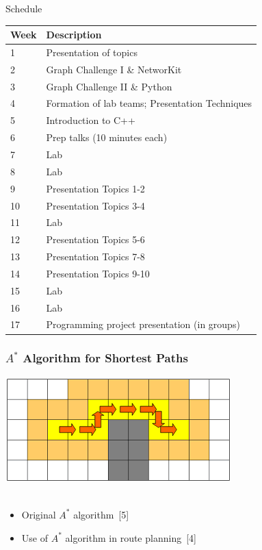 \documentclass[titlepage,german,presentation]{beamer}
\begin{document}
\begin{frame}{Schedule}

\small{
    \centering
      \begin{tabular}{|l||l|} \hline
        Week & Description  \\ \hline
        1 &  Presentation of topics \\
        2 &  Graph Challenge I \& NetworKit \\
        3 &  Graph Challenge II \& Python \\
        4 &  Formation of lab teams; Presentation Techniques \\
        5 &  Introduction to C++ \\
        6 &  Prep talks (10 minutes each) \\
        7 &  Lab \\
        8 &  Lab \\
        9 &  Presentation Topics 1-2 \\
        10 & Presentation Topics 3-4 \\
        11 & Lab \\ 
        12 & Presentation Topics 5-6 \\
        13 & Presentation Topics 7-8 \\
        14 & Presentation Topics 9-10 \\ 
        15 & Lab \\
        16 & Lab \\
        17 & Programming project presentation (in groups) \\ \hline
      \end{tabular}
}
\end{frame}



\begin{frame}
\frametitle{$A^*$ Algorithm for Shortest Paths}

\begin{center}
\includegraphics[height=0.2\textwidth]{obstacle.png}\\
~\\
\end{center}

\begin{itemize}
\item Original $A^*$ algorithm~[5]
\medskip
\item Use of $A^*$ algorithm in route planning~[4] 
\end{itemize}

\end{frame}
\end{document}

